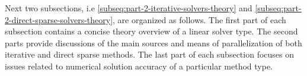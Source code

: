 
Next two subsections, i.e  \ref{subseq:part-2-iterative-solvers-theory} and \ref{subseq:part-2-direct-sparse-solvers-theory}, are organized as follows. The first part of each subsection contains a concise theory overview of a linear solver type. The second parts provide discussions of the main sources and means of parallelization of both iterative and direct sparse methods. The last part of each subsection focuses on issues related to numerical solution accuracy of a particular method type.\\